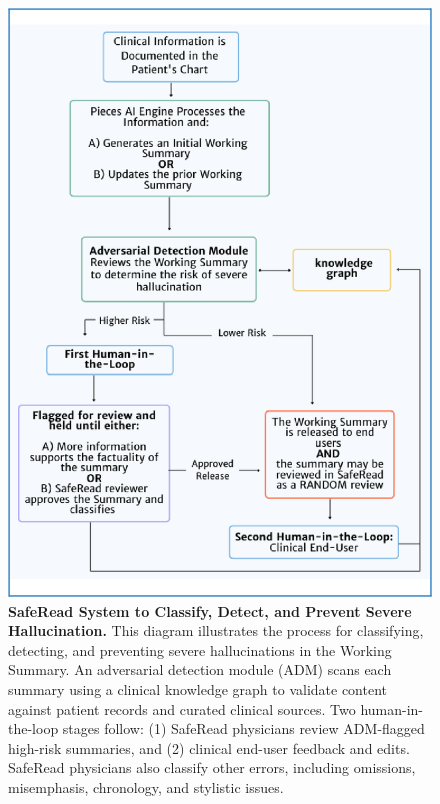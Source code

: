 \documentclass{style/myclass}
\begin{document}
\begin{figure}[t]
    \centering
    \includegraphics[width=\linewidth]{figure/Picture2.png}
    \caption{\textbf{SafeRead System to Classify, Detect, and Prevent Severe Hallucination.} This diagram illustrates the process for classifying, detecting, and preventing severe hallucinations in the Working Summary. An adversarial detection module (ADM) scans each summary using a clinical knowledge graph to validate content against patient records and curated clinical sources. Two human-in-the-loop stages follow: (1) SafeRead physicians review ADM-flagged high-risk summaries, and (2) clinical end-user feedback and edits. SafeRead physicians also classify other errors, including omissions, misemphasis, chronology, and stylistic issues.}
    \label{fig:2}
\end{figure}
\end{document}
